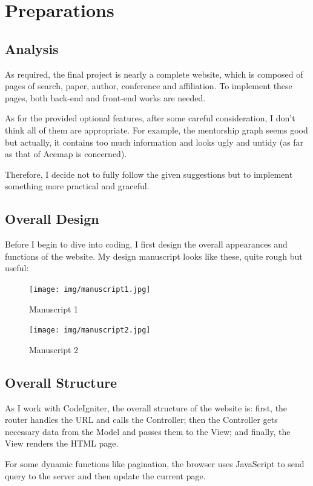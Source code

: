 \documentclass[a4paper]{article}
\begin{document}
    \tableofcontents
    \newpage
    \section{Preparations}
        \subsection{Analysis}
As required, the final project is nearly a complete website, which is composed of pages of search, paper, author,
conference and affiliation. To implement these pages, both back-end and front-end works are needed. 

As for the provided optional features, after some careful consideration, I don't think all of them are appropriate.
For example, the mentorship graph seems good but actually, it contains too much information and looks ugly and untidy
(as far as that of Acemap is concerned).

Therefore, I decide not to fully follow the given suggestions but to implement something more practical and graceful.  
        \subsection{Overall Design}
Before I begin to dive into coding, I first design the overall appearances and functions of the website. 
My design manuscript looks like these, quite rough but useful:
\begin{figure}[H]
\begin{minipage}[t]{0.5\linewidth}  
\centering  
\texttt{[image: img/manuscript1.jpg]}  
\caption{Manuscript 1}  
\label{fig:side:a}  
\end{minipage}%
\begin{minipage}[t]{0.5\linewidth}  
\centering  
\texttt{[image: img/manuscript2.jpg]}  
\caption{Manuscript 2}  
\label{fig:side:b}  
\end{minipage}  
\end{figure}
        \subsection{Overall Structure}
As I work with CodeIgniter, the overall structure of the website is: first, the router handles the URL and calls
the Controller; then the Controller gets necessary data from the Model and passes them to the View; and finally,
the View renders the HTML page. 

For some dynamic functions like pagination, the browser uses JavaScript to send query to the server and then update 
the current page.
    \newpage
\end{document}
